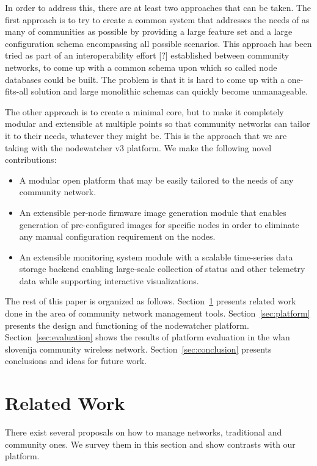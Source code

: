 \documentclass[5p,sort&compress]{elsarticle}
\begin{document}
In order to address this, there are at least two approaches that can be taken.
The first approach is to try to create a common system that addresses the needs of as many of communities as possible by providing a large feature set and a large configuration schema encompassing all possible scenarios.
This approach has been tried as part of an interoperability effort [?] established between community networks, to come up with a common schema upon which so called node databases could be built.
The problem is that it is hard to come up with a one-fits-all solution and large monolithic schemas can quickly become unmanageable.

The other approach is to create a minimal core, but to make it completely modular and extensible at multiple points so that community networks can tailor it to their needs, whatever they might be.
This is the approach that we are taking with the nodewatcher v3 platform.
We make the following novel contributions:
\begin{itemize}
\item A modular open platform that may be easily tailored to the needs of any community network.
\item An extensible per-node firmware image generation module that enables generation of pre-configured images for specific nodes in order to eliminate any manual configuration requirement on the nodes.
\item An extensible monitoring system module with a scalable time-series data storage backend enabling large-scale collection of status and other telemetry data while supporting interactive visualizations.
\end{itemize}

The rest of this paper is organized as follows.
Section~\ref{sec:related-work} presents related work done in the area of community network management tools.
Section~\ref{sec:platform} presents the design and functioning of the nodewatcher platform.
Section~\ref{sec:evaluation} shows the results of platform evaluation in the wlan slovenija community wireless network.
Section~\ref{sec:conclusion} presents conclusions and ideas for future work.

\section{Related Work}
\label{sec:related-work}

There exist several proposals on how to manage networks, traditional and community ones.
We survey them in this section and show contrasts with our platform.
\end{document}
